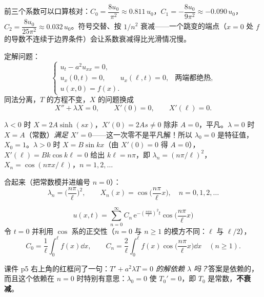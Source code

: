 \documentclass[11pt]{ctexart}
\let\origsubhdr\subhdr
\renewcommand{\subhdr}[1]{\par\needspace{3\baselineskip}\origsubhdr{#1}}
\begin{document}
前三个系数可以口算核对：$C_0=\dfrac{8u_0}{\pi^2}\approx0.811\,u_0$，$C_1=-\dfrac{8u_0}{9\pi^2}\approx-0.090\,u_0$，$C_2=\dfrac{8u_0}{25\pi^2}\approx0.032\,u_0$。符号交替、按 $1/n^2$ 衰减——一个跳变的端点（$x=0$ 处 $f$ 的导数不连续于边界条件）会让系数衰减得比光滑情况慢。


定解问题：
\begin{equation}
  \begin{cases}
    u_t-a^2u_{xx}=0,\\
    u_x(0,t)=0,\qquad u_x(\ell,t)=0, & \text{两端都绝热},\\
    u(x,0)=f(x).
  \end{cases}
\end{equation}
同法分离，$T$ 的方程不变，$X$ 的问题换成
\begin{equation}
  X''+\lambda X=0,\qquad X'(0)=0,\qquad X'(\ell)=0 .
\end{equation}

$\lambda<0$ 时 $X=2A\sinh(sx)$，$X'(0)=2As\neq0$ 除非 $A=0$，平凡。$\lambda=0$ 时 $X=A$（常数）\emph{满足} $X'=0$——这一次零不是平凡解！所以 $\lambda_0=0$ 是特征值，$X_0=1$。$\lambda>0$ 时 $X=B\sin kx$（由 $X'(0)=0$ 得 $A=0$），$X'(\ell)=Bk\cos k\ell=0$ 给出 $k\ell=n\pi$，即 $\lambda_n=(n\pi/\ell)^2$，$X_n=\cos(n\pi x/\ell)$，$n=1,2,\dots$

合起来（把常数模并进编号 $n=0$）：
\begin{equation}
  \boxed{\;\lambda_n=\Big(\frac{n\pi}{\ell}\Big)^2,\qquad X_n(x)=\cos\Big(\frac{n\pi}{\ell}x\Big),\quad n=0,1,2,\dots\;}
\end{equation}

\begin{equation}
  u(x,t)=\sum_{n=0}^{\infty}C_n\,\mathrm e^{-\left(\frac{n\pi a}{\ell}\right)^2t}\cos\Big(\frac{n\pi}{\ell}x\Big)
\end{equation}
令 $t=0$ 并利用 $\cos$ 系的正交性（$n=0$ 与 $n\ge1$ 的模方不同：$\ell$ 与 $\ell/2$），
\begin{equation}
  C_0=\frac{1}{\ell}\int_0^{\ell}f(x)\dd x,\qquad
  C_n=\frac{2}{\ell}\int_0^{\ell}f(x)\cos\Big(\frac{n\pi}{\ell}x\Big)\dd x\quad(n\ge1).
\end{equation}


课件 p5 右上角的红框问了一句：\emph{$T'+a^2\lambda T=0$ 的解依赖 $\lambda$ 吗？}答案是依赖的，而且这个依赖在 $n=0$ 时特别有意思：$\lambda_0=0$ 使 $T_0'=0$，即 $T_0$ 是常数，\textbf{不衰减}。
\end{document}
